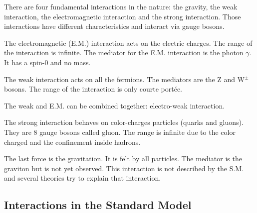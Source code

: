     \begin{center}
        \begin{tabular}{|c|c|c|c|c|c}

        \end{tabular}
    \end{center}

    There are four fundamental interactions in the nature: the gravity, the weak interaction, the electromagnetic interaction and the strong interaction.
    Those interactions have different characteristics and interact via gauge bosons.
    
    The electromagnetic (E.M.) interaction acts on the electric charges. 
    The range of the interaction is infinite. 
    The mediator for the E.M. interaction is the photon $\gamma$.
    It has a spin-0 and no mass. 
    
    The weak interaction acts on all the fermions.
    The mediators are the Z and W$^\pm$ bosons.
    The range of the interaction is only courte portée.

    The weak and E.M. can be combined together: electro-weak interaction.

    The strong interaction behaves on color-charges particles (quarks and gluons).
    They are 8 gauge bosons called gluon.
    The range is infinite due to the color charged and the confinement inside hadrons.

    The last force is the gravitation. 
    It is felt by all particles.
    The mediator is the graviton but is not yet observed.
    This interaction is not described by the S.M. and several theories try to explain that interaction.


    \subsection{Interactions in the Standard Model}

